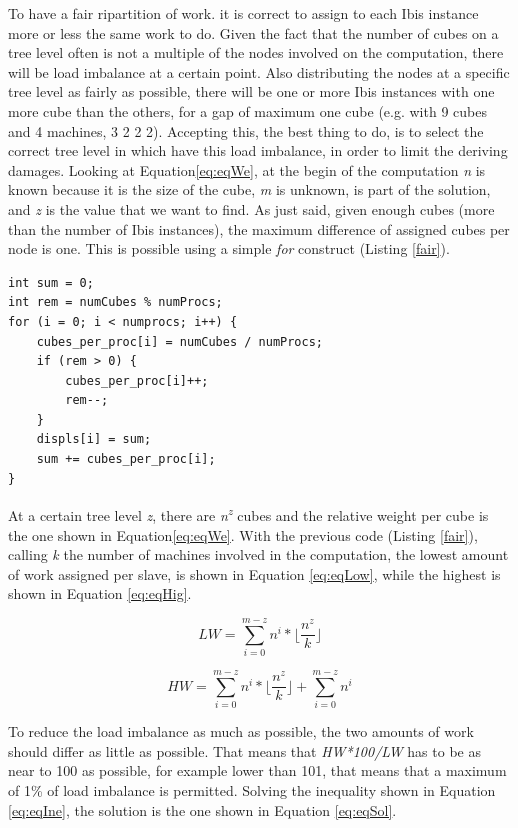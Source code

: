 \documentclass[a4paper]{article}
\begin{document}
To have a fair ripartition of work. it is correct to assign to each Ibis instance more or less the same work to do. Given the fact that the number of cubes on a tree level often is not a multiple of the nodes involved on the computation, there will be load imbalance at a certain point. Also distributing the nodes at a specific tree level as fairly as possible, there will be one or more Ibis instances with one more cube than the others, for a gap of maximum one cube (e.g. with 9 cubes and 4 machines, 3 2 2 2). Accepting this, the best thing to do, is to select the correct tree level in which have this load imbalance, in order to limit the deriving damages. Looking at Equation\ref{eq:eqWe}, at the begin of the computation \textit{n} is known because it is the size of the cube, \textit{m} is unknown, is part of the solution, and \textit{z} is the value that we want to find. As just said, given enough cubes (more than the number of Ibis instances), the maximum difference of assigned cubes per node is one. This is possible using a simple \textit{for} construct (Listing \ref{fair}).

\begin{lstlisting}[label=fair, caption=fair distribution of cubes]
int sum = 0;
int rem = numCubes % numProcs; 
for (i = 0; i < numprocs; i++) {
    cubes_per_proc[i] = numCubes / numProcs;
    if (rem > 0) {
        cubes_per_proc[i]++;
        rem--;
    }
    displs[i] = sum;
    sum += cubes_per_proc[i];
}
\end{lstlisting}
\FloatBarrier

At a certain tree level \textit{z}, there are \textit{n\textsuperscript{z}} cubes and the relative weight per cube is the one shown in Equation\ref{eq:eqWe}. With the previous code (Listing \ref{fair}), calling \textit{k} the number of machines involved in the computation, the lowest amount of work assigned per slave, is shown in Equation \ref{eq:eqLow}, while the highest is shown in Equation \ref{eq:eqHig}. 

\begin{equation} 
\label{eq:eqLow}
LW=\sum_{i=0}^{m-z}{n^i}*\lfloor\frac{n^z}{k}\rfloor
\end{equation}
\FloatBarrier

\begin{equation} 
\label{eq:eqHig}
HW=\sum_{i=0}^{m-z}{n^i}*\lfloor\frac{n^z}{k}\rfloor +  \sum_{i=0}^{m-z}{n^i}
\end{equation}
\FloatBarrier

To reduce the load imbalance as much as possible, the two amounts of work should differ as little as possible. That means that \textit{HW*100/LW} has to be as near to 100 as possible, for example lower than 101, that means that a maximum of 1\% of load imbalance is permitted. Solving the inequality shown in Equation \ref{eq:eqIne}, the solution is the one shown in Equation \ref{eq:eqSol}. 
\end{document}
